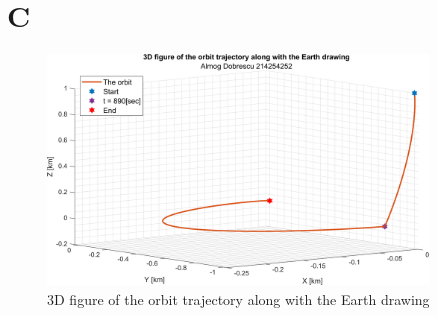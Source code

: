 \documentclass[11pt, a4paper]{article}
\begin{document}
\section{C}
\begin{figure}[H]
    \centering
    \includegraphics[width=0.9\textwidth]{images/3D plot.png}
    \caption{3D figure of the orbit trajectory along with the Earth drawing}
    \label{fig:3D-plot}
\end{figure}
\end{document}
